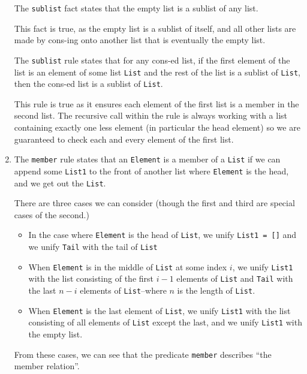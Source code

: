 \documentclass[12pt,letterpaper]{article}
\begin{document}
\begin{enumerate}
      The \texttt{sublist} fact states that the empty list is a sublist of any list.

      This fact is true, as the empty list is a sublist of itself, and all other lists are made by cons-ing onto another list that is eventually the empty list.

      The \texttt{sublist} rule states that for any cons-ed list, if the first element of the list is an element of some list \texttt{List} and the rest of the list is a sublist of \texttt{List}, then the cons-ed list is a sublist of \texttt{List}.

      This rule is true as it ensures each element of the first list is a member in the second list. The recursive call within the rule is always working with a list containing exactly one less element (in particular the head element) so we are guaranteed to check each and every element of the first list.

    \item

      The \texttt{member} rule states that an \texttt{Element} is a member of a \texttt{List} if we can append some \texttt{List1} to the front of another list where \texttt{Element} is the head, and we get out the \texttt{List}.

      There are three cases we can consider (though the first and third are special cases of the second.)

      \begin{itemize}
        \item
          In the case where \texttt{Element} is the head of \texttt{List}, we unify \texttt{List1 = []} and we unify \texttt{Tail} with the tail of \texttt{List}

        \item
          When \texttt{Element} is in the middle of \texttt{List} at some index $i$, we unify \texttt{List1} with the list consisting of the first $i - 1$ elements of \texttt{List} and \texttt{Tail} with the last $n - i$ elements of \texttt{List}--where $n$ is the length of \texttt{List}.

        \item
          When \texttt{Element} is the last element of \texttt{List}, we unify \texttt{List1} with the list consisting of all elements of \texttt{List} except the last, and we unify \texttt{List1} with the empty list.
      \end{itemize}

      From these cases, we can see that the predicate \texttt{member} describes ``the member relation''.
  \end{enumerate}
\end{document}
